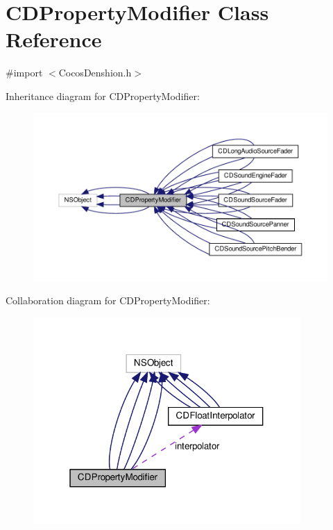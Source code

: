 \hypertarget{interfaceCDPropertyModifier}{}\section{C\+D\+Property\+Modifier Class Reference}
\label{interfaceCDPropertyModifier}


{\ttfamily \#import $<$Cocos\+Denshion.\+h$>$}



Inheritance diagram for C\+D\+Property\+Modifier\+:
\nopagebreak
\begin{figure}[H]
\begin{center}
\leavevmode
\includegraphics[width=350pt]{interfaceCDPropertyModifier__inherit__graph}
\end{center}
\end{figure}


Collaboration diagram for C\+D\+Property\+Modifier\+:
\nopagebreak
\begin{figure}[H]
\begin{center}
\leavevmode
\includegraphics[width=289pt]{interfaceCDPropertyModifier__coll__graph}
\end{center}
\end{figure}
